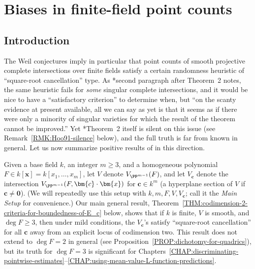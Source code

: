 \documentclass[12pt]{report}
\begin{document}

\chapter{Biases in finite-field point counts}
\label{CHAP:biases-over-finite-fields}

\section{Introduction}

The Weil conjectures imply in particular that point counts of smooth projective complete intersections over finite fields satisfy a certain randomness heuristic of ``square-root cancellation'' type.
As \cite{hooley1991number}*{second paragraph after Theorem~2} notes,
the same heuristic fails for \emph{some} singular complete intersections, and it would be nice to have a ``satisfactory criterion'' to determine when, but ``on the scanty evidence at present available, all we can say as yet is that it seems as if there were only a minority of singular varieties for which the result of the theorem cannot be improved.''
Yet \cite{hooley1991number}*{Theorem~2} itself is silent on this issue (see Remark~\ref{RMK:Hoo91-silence} below), and the full truth is far from known in general.
Let us now summarize positive results of \cite{wang2022dichotomous} in this direction.

Given a base field $k$, an integer $m\geq 3$, and a homogeneous polynomial $F\in k[\bm{x}]=k[x_1,\dots,x_m]$, let $V$ denote $V_{\PP^{m-1}}(F)$, and let $V_{\bm{c}}$ denote the intersection $V_{\PP^{m-1}}(F,\bm{c}\cdot\bm{x})$ for $\bm{c}\in k^m$ (a hyperplane section of $V$ if $\bm{c}\neq \bm{0}$).
(We will repeatedly use this setup with $k,m,F,V,V_{\bm{c}}$; call it the \emph{Main Setup} for convenience.)
Our main general result, Theorem~\ref{THM:codimension-2-criteria-for-boundedness-of-E_c} below, shows that if $k$ is finite, $V$ is smooth, and $\deg{F}\geq 3$, then under mild conditions, the $V_{\bm{c}}$'s satisfy ``square-root cancellation'' for all $\bm{c}$ away from an explicit locus of codimension two.
This result does not extend to $\deg{F}=2$ in general (see Proposition~\ref{PROP:dichotomy-for-quadrics}),
but its truth for $\deg{F}=3$ is significant for Chapters~\ref{CHAP:discriminating-pointwise-estimates}--\ref{CHAP:using-mean-value-L-function-predictions}.
\end{document}
